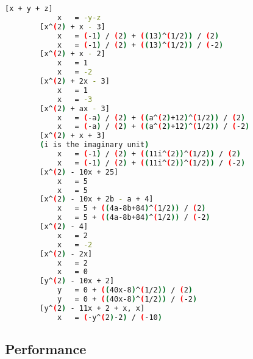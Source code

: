 \begin{minipage}{\linewidth}
    \begin{lstlisting}[language=sh,caption={Example of use of the program evaluating expressions.}, label={lst:example-evaluate}]
        [x + y + z]
            x	= -y-z
        [x^(2) + x - 3]
            x	= (-1) / (2) + ((13)^(1/2)) / (2)
            x	= (-1) / (2) + ((13)^(1/2)) / (-2)
        [x^(2) + x - 2]
            x	= 1
            x	= -2
        [x^(2) + 2x - 3]
            x	= 1
            x	= -3
        [x^(2) + ax - 3]
            x	= (-a) / (2) + ((a^(2)+12)^(1/2)) / (2)
            x	= (-a) / (2) + ((a^(2)+12)^(1/2)) / (-2)
        [x^(2) + x + 3]
        (i is the imaginary unit)
            x	= (-1) / (2) + ((11i^(2))^(1/2)) / (2)
            x	= (-1) / (2) + ((11i^(2))^(1/2)) / (-2)
        [x^(2) - 10x + 25]
            x	= 5
            x	= 5
        [x^(2) - 10x + 2b - a + 4]
            x	= 5 + ((4a-8b+84)^(1/2)) / (2)
            x	= 5 + ((4a-8b+84)^(1/2)) / (-2)
        [x^(2) - 4]
            x	= 2
            x	= -2
        [x^(2) - 2x]
            x	= 2
            x	= 0
        [y^(2) - 10x + 2]
            y	= 0 + ((40x-8)^(1/2)) / (2)
            y	= 0 + ((40x-8)^(1/2)) / (-2)
        [y^(2) - 11x + 2 + x, x]
            x	= (-y^(2)-2) / (-10)
    \end{lstlisting}
\end{minipage}

\subsection{Performance}\label{subsec:performance}


